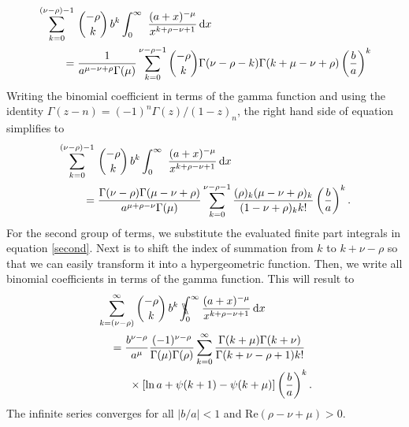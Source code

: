 \begin{equation}\label{xxx1}
\begin{split}
    &\sum_{k=0}^{(\nu-\rho)-1} \, {- \rho \choose k} \, b^{k} \int_0^{\infty} \ \frac{(a+x)^{-\mu}}{x^{k+\rho-\nu+1}} \,\mathrm{d}x \\
    &\hspace{8mm}= \frac{1}{a^{\mu-\nu+\rho} \Gamma(\mu)} \sum_{k=0}^{\nu-\rho-1} {-\rho \choose k} \Gamma(\nu-\rho-k) \Gamma(k+\mu-\nu+\rho) \left(\frac{b}{a}\right)^k
    \end{split}
\end{equation}
Writing the binomial coefficient in terms of the gamma function and using the identity $\Gamma(z-n) = (-1)^{n} \Gamma(z)/(1-z)_n$, the right hand side of equation simplifies to
\begin{equation}\label{xxx1v2}
\begin{split}
    &\sum_{k=0}^{(\nu-\rho)-1} \, {- \rho \choose k} \, b^{k} \int_0^{\infty} \ \frac{(a+x)^{-\mu}}{x^{k+\rho-\nu+1}} \,\mathrm{d}x \\
    &\hspace{8mm}= \frac{\Gamma(\nu-\rho) \Gamma(\mu-\nu+\rho)}{a^{\mu+\rho-\nu}\Gamma(\mu)} \sum_{k=0}^{\nu-\rho-1} \frac{(\rho)_k (\mu-\nu+\rho)_k}{(1-\nu+\rho)_k k!} \left(\frac{b}{a}\right)^k.
       \end{split}
\end{equation}
For the second group of terms, we substitute the evaluated finite part integrals in equation \eqref{second}. Next is to shift the index of summation from $k$ to $k+\nu-\rho$ so that we can easily transform it into a hypergeometric function. Then, we write all binomial coefficients in terms of the gamma function. This will result to
\begin{equation}
    \begin{split} \label{xxx2}
        &\sum_{k=(\nu-\rho)}^{\infty} {- \rho \choose k} \, b^{k} \, \bbint{0}{\infty} \frac{(a+x)^{-\mu}}{x^{k+\rho-\nu+1}} \,\mathrm{d}x\\
        &\hspace{4mm}= 
    \frac{b^{\nu-\rho}}{a^{\mu}} \frac{(-1)^{\nu-\rho}}{\Gamma(\mu) \Gamma(\rho)} \sum_{k=0}^{\infty} \frac{\Gamma(k+\mu) \Gamma(k+\nu)}{\Gamma(k+\nu-\rho+1) k!} \\& \hspace{10mm} \times \left[\ln{a}+\psi(k+1)-\psi(k+\mu)\right]\left(\frac{b}{a}\right)^k.
    \end{split}
\end{equation}
The infinite series converges for all $|b/a|<1$ and $\mathrm{Re}(\rho-\nu+\mu)>0$.

